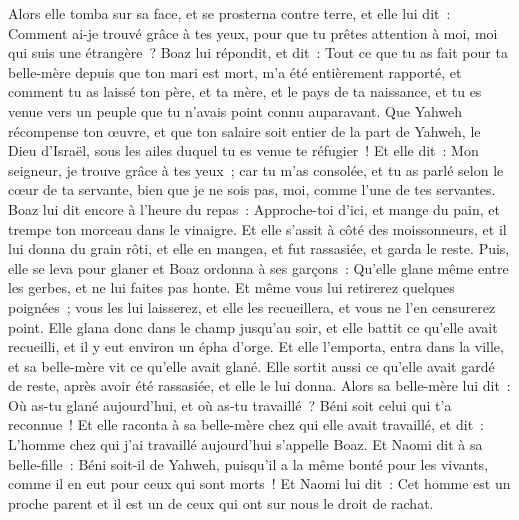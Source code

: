 \begin{multicols}{2}
Alors elle tomba sur sa face, et se prosterna contre terre, et elle lui dit~: Comment ai-je trouvé grâce à tes yeux, pour que tu prêtes attention à moi, moi qui suis une étrangère~?
Boaz lui répondit, et dit~: Tout ce que tu as fait pour ta belle-mère depuis que ton mari est mort, m'a été entièrement rapporté, et comment tu as laissé ton père, et ta mère, et le pays de ta naissance, et tu es venue vers un peuple que tu n'avais point connu auparavant.
Que Yahweh récompense ton œuvre, et que ton salaire soit entier de la part de Yahweh, le Dieu d'Israël, sous les ailes duquel tu es venue te réfugier~!
Et elle dit~: Mon seigneur, je trouve grâce à tes yeux~; car tu m'as consolée, et tu as parlé selon le cœur de ta servante, bien que je ne sois pas, moi, comme l'une de tes servantes.
Boaz lui dit encore à l'heure du repas~: Approche-toi d'ici, et mange du pain, et trempe ton morceau dans le vinaigre. Et elle s'assit à côté des moissonneurs, et il lui donna du grain rôti, et elle en mangea, et fut rassasiée, et garda le reste.
Puis, elle se leva pour glaner et Boaz ordonna à ses garçons~: Qu'elle glane même entre les gerbes, et ne lui faites pas honte.
Et même vous lui retirerez quelques poignées~; vous les lui laisserez, et elle les recueillera, et vous ne l'en censurerez point.
Elle glana donc dans le champ jusqu'au soir, et elle battit ce qu'elle avait recueilli, et il y eut environ un épha d'orge.
Et elle l'emporta, entra dans la ville, et sa belle-mère vit ce qu'elle avait glané. Elle sortit aussi ce qu'elle avait gardé de reste, après avoir été rassasiée, et elle le lui donna.
Alors sa belle-mère lui dit~: Où as-tu glané aujourd'hui, et où as-tu travaillé~? Béni soit celui qui t'a reconnue~! Et elle raconta à sa belle-mère chez qui elle avait travaillé, et dit~: L'homme chez qui j'ai travaillé aujourd'hui s'appelle Boaz.
Et Naomi dit à sa belle-fille~: Béni soit-il de Yahweh, puisqu'il a la même bonté pour les vivants, comme il en eut pour ceux qui sont morts~! Et Naomi lui dit~: Cet homme est un proche parent et il est un de ceux qui ont sur nous le droit de rachat.

\end{multicols}
